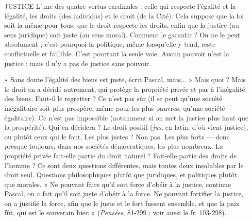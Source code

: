{JUSTICE L'une des quatre vertus cardinales : celle qui respecte l'égalité et la
légalité, les droits (des individus) et le droit (de la Cité). Cela suppose
que la loi soit la même pour tous, que le droit respecte les droits, enfin que
la justice (au sens juridique) soit juste (au sens moral). Comment le garantir ?
On ne le peut absolument ; c’est pourquoi la politique, même lorsqu’elle y
tend, reste conflictuelle et faillible. C’est pourtant la seule voie. Aucun pouvoir
n’est la justice ; mais il n’y a pas de justice sans pouvoir.

« Sans doute l'égalité des biens est juste, écrit Pascal, mais... » Mais quoi ?
Mais le droit en a décidé autrement, qui protège la propriété privée et par à
l’inégalité des biens. Faut-il le regretter ? Ce n’est pas sûr (il se peut qu’une
société inégalitaire soit plus prospère, même pour les plus pauvres, qu’une
société égalitaire). Ce n’est pas impossible (notamment si on met la justice plus
haut que la prospérité). Qui en décidera ? Le droit positif ({\it jus}, en latin, d’où
vient justice), ou plutôt ceux qui le font. Les plus justes ? Non pas. Les plus
forts — donc presque toujours, dans nos sociétés démocratiques, les plus nombreux.
La propriété privée fait-elle partie du droit naturel ? Fait-elle partie des
droits de l’homme ? Ce sont deux questions différentes, mais toutes deux insolubles
par le droit seul. Questions philosophiques plutôt que juridiques, et politiques
plutôt que morales. « Ne pouvant faire qu’il soit force d’obéir à la justice,
continue Pascal, on a fait qu’il soit juste d’obéir à la force. Ne pouvant fortifier
la justice, on a justifié la force, afin que le juste et le fort fussent ensemble, et
que la paix fût, qui est le souverain bien » ({\it Pensées}, 81-299 ; voir aussi le
fr. 103-298).

}
